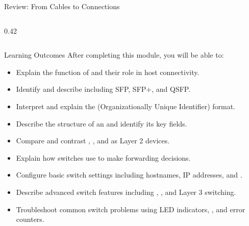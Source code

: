 \documentclass[aspectratio=169]{beamer}  %
\begin{document}
\begin{frame}{Review: From Cables to Connections}
\begin{columns}[T]
\begin{column}{0.42\textwidth}
\begin{center}
            \end{center}


        \end{column}
    \end{columns}
\end{frame}

\begin{frame}[t,allowframebreaks]{Learning Outcomes}
    After completing this module, you will be able to:
    \vspace{0.5em}
    \begin{itemize}
        \item Explain the function of  and their role in host connectivity.
        \item Identify and describe  including SFP, SFP+, and QSFP.
        \item Interpret  and explain the  (Organizationally Unique Identifier) format.
        \item Describe the structure of an  and identify its key fields.
        \item Compare and contrast , , and  as Layer 2 devices.
        \item Explain how switches use  to make forwarding decisions.
        \item Configure basic switch settings including hostnames, IP addresses, and .
        \item Describe advanced switch features including , , and Layer 3 switching.
        \item Troubleshoot common switch problems using LED indicators, , and error counters.
    \end{itemize}
\end{frame}
\end{document}
